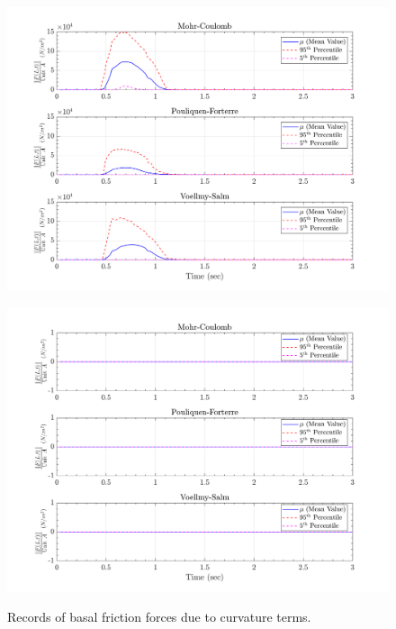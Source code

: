 \documentclass{article}
\begin{document}
\begin{figure}[H]
	\begin{minipage}[b]{0.5\linewidth}
    	\centering
    	\includegraphics[width=1\textwidth]{InclinedPlane/LocalRecords/Records/Fbc_L15.png}
    	\label{fig:Ramp-L3-Fbc}
	\end{minipage}
	\begin{minipage}[b]{0.5\linewidth}
		\centering
		\includegraphics[width=1\textwidth]{InclinedPlane/LocalRecords/Records/Fbc_L17.png}
    	\label{fig:Ramp-L4-Fbc}
    \end{minipage}
    \caption{Records of basal friction forces due to curvature terms.}
    \label{fig:Ramp-LM-Fbc}
\end{figure}
\end{document}
